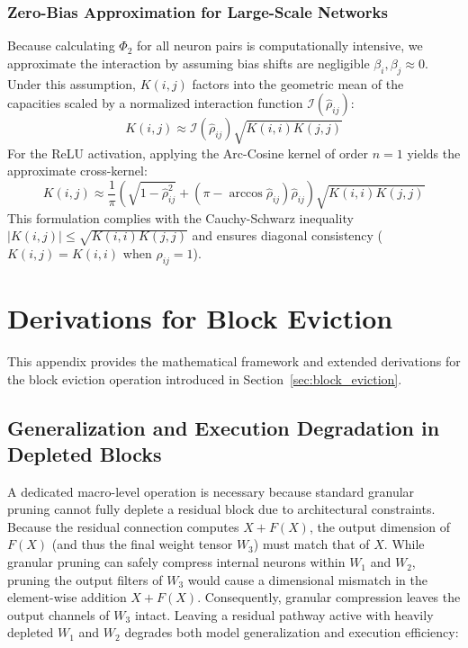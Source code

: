 \documentclass[11pt, a4paper, copyright, gdm]{google}
\newcommand{\calI}{\mathcal{I}}
\theoremstyle{definition}
\begin{document}
\subsubsection{Zero-Bias Approximation for Large-Scale Networks}
Because calculating $\Phi_2$ for all neuron pairs is computationally intensive, we approximate the interaction by assuming bias shifts are negligible $\beta_i, \beta_j \approx 0$. Under this assumption, $K(i, j)$ factors into the geometric mean of the capacities scaled by a normalized interaction function $\calI(\hat{\rho}_{ij})$:
\begin{equation}
    K(i, j) \approx \calI(\hat{\rho}_{ij}) \sqrt{K(i, i) K(j, j)}
\end{equation}
For the ReLU activation, applying the Arc-Cosine kernel of order $n=1$ yields the approximate cross-kernel:
\begin{equation}
\label{eq:approx_kernel}
    K(i, j) \approx \frac{1}{\pi} \left( \sqrt{1 - \hat{\rho}_{ij}^2} + (\pi - \arccos \hat{\rho}_{ij}) \hat{\rho}_{ij} \right) \sqrt{K(i, i) K(j, j)}
\end{equation}
This formulation complies with the Cauchy-Schwarz inequality $|K(i,j)| \leq \sqrt{K(i,i)K(j,j)}$ and ensures diagonal consistency ($K(i,j) = K(i,i)$ when $\hat{\rho}_{ij}=1$).


\section{Derivations for Block Eviction}
\label{sec:app_block_eviction}

This appendix provides the mathematical framework and extended derivations for the block eviction operation introduced in Section~\ref{sec:block_eviction}.

\subsection{Generalization and Execution Degradation in Depleted Blocks}
A dedicated macro-level operation is necessary because standard granular pruning cannot fully deplete a residual block due to architectural constraints. Because the residual connection computes $X + F(X)$, the output dimension of $F(X)$ (and thus the final weight tensor $W_3$) must match that of $X$. While granular pruning can safely compress internal neurons within $W_1$ and $W_2$, pruning the output filters of $W_3$ would cause a dimensional mismatch in the element-wise addition $X + F(X)$. Consequently, granular compression leaves the output channels of $W_3$ intact. Leaving a residual pathway active with heavily depleted $W_1$ and $W_2$ degrades both model generalization and execution efficiency:
\end{document}
